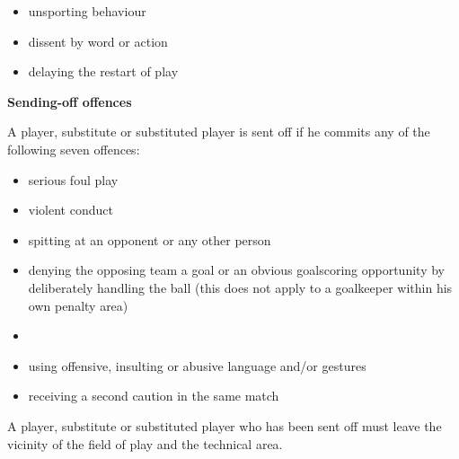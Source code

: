 {\begin{itemize}
\item unsporting behaviour
\item dissent by word or action 
\item delaying the restart of play
\end{itemize}

{\bfseries Sending-off offences}

\headlinebox

A player, substitute or substituted player is sent off if he commits any of the following seven offences:

\begin{itemize}
\item serious foul play
\item violent conduct
\item spitting at an opponent or any other person
\item denying the opposing team a goal or an obvious goalscoring opportunity by deliberately handling the ball (this does not apply to a goalkeeper within his own penalty area)
\item {}
\item using offensive, insulting or abusive language and/or gestures
\item receiving a second caution in the same match
\end{itemize}

\bigskip

A player, substitute or substituted player who has been sent off must leave the vicinity of the field of play and the technical area.}